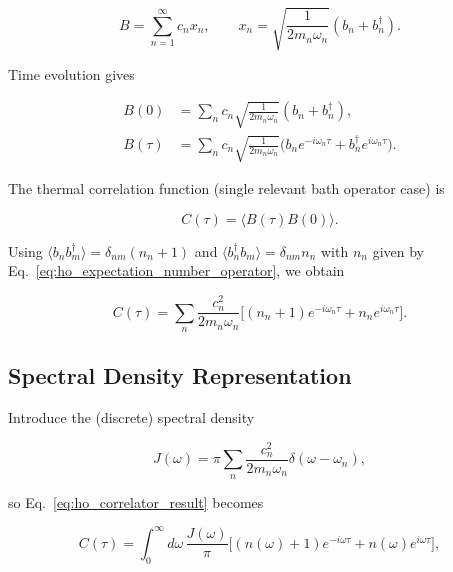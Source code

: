 \begin{equation} \label{eq:ho_bath_operator}
	B = \sum_{n=1}^{\infty} c_n x_n, \qquad x_n = \sqrt{\frac{1}{2 m_n \omega_n}} (b_n + b_n^{\dagger}).
\end{equation}

\noindent
Time evolution gives

\begin{align}
	B(0)    & = \sum_{n} c_n \sqrt{\frac{1}{2 m_n \omega_n}} (b_n + b_n^{\dagger}), \label{eq:ho_bath_operator_t0}                                                   \\
	B(\tau) & = \sum_{n} c_n \sqrt{\frac{1}{2 m_n \omega_n}} \Big(b_n e^{-i \omega_n \tau} + b_n^{\dagger} e^{i \omega_n \tau}\Big). \label{eq:ho_bath_operator_tau}
\end{align}

\noindent
The thermal correlation function (single relevant bath operator case) is

\begin{equation} \label{eq:ho_bath_correlator}
	C(\tau) = \langle B(\tau) B(0) \rangle.
\end{equation}

\noindent
Using $\langle b_n b_m^{\dagger} \rangle = \delta_{nm}(n_n+1)$ and $\langle b_n^{\dagger} b_m \rangle = \delta_{nm} n_n$ with $n_n$ given by Eq.~\eqref{eq:ho_expectation_number_operator}, we obtain

\begin{equation} \label{eq:ho_correlator_result}
	C(\tau) = \sum_{n} \frac{c_n^2}{2 m_n \omega_n} \Big[(n_n+1) e^{-i \omega_n \tau} + n_n e^{i \omega_n \tau}\Big].
\end{equation}


\subsection{Spectral Density Representation}
\label{subsec:ho_spectral_density}

\noindent
Introduce the (discrete) spectral density

\begin{equation} \label{eq:ho_bath_spectral_density}
	J(\omega) = \pi \sum_{n} \frac{c_n^2}{2 m_n \omega_n} \delta(\omega - \omega_n),
\end{equation}

\noindent
so Eq.~\eqref{eq:ho_correlator_result} becomes

\begin{equation} \label{eq:ho_correlator_spectral_density}
	C(\tau) = \int_{0}^{\infty} d\omega \, \frac{J(\omega)}{\pi} \Big[(n(\omega)+1)e^{-i \omega \tau} + n(\omega) e^{i \omega \tau}\Big],
\end{equation}

